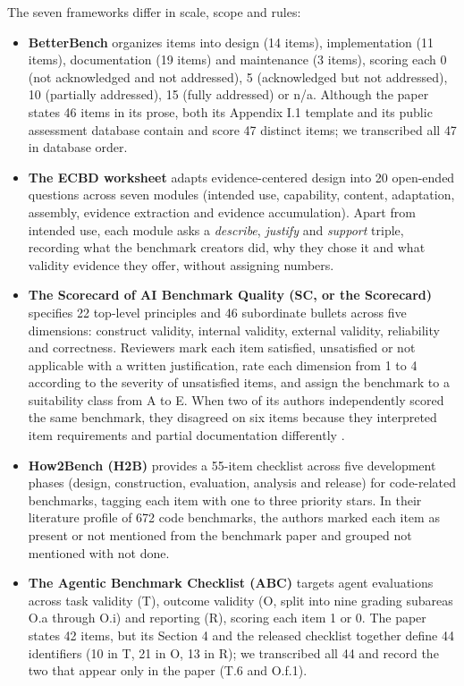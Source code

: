 \documentclass[10pt,conference]{IEEEtran}
\begin{document}
The seven frameworks differ in scale, scope and rules:
\begin{itemize}
\item \textbf{BetterBench} \cite{reuel_betterbench} organizes items into design (14 items), implementation (11 items), documentation (19 items) and maintenance (3 items), scoring each 0 (not acknowledged and not addressed), 5 (acknowledged but not addressed), 10 (partially addressed), 15 (fully addressed) or n/a. Although the paper states 46 items in its prose, both its Appendix I.1 template and its public assessment database contain and score 47 distinct items; we transcribed all 47 in database order.
\item \textbf{The ECBD worksheet} \cite{liu_ecbd_2024} adapts evidence-centered design into 20 open-ended questions across seven modules (intended use, capability, content, adaptation, assembly, evidence extraction and evidence accumulation). Apart from intended use, each module asks a \emph{describe}, \emph{justify} and \emph{support} triple, recording what the benchmark creators did, why they chose it and what validity evidence they offer, without assigning numbers.
\item \textbf{The Scorecard of AI Benchmark Quality (SC, or the Scorecard)} \cite{san_joaquin_scorecard_2026} specifies 22 top-level principles and 46 subordinate bullets across five dimensions: construct validity, internal validity, external validity, reliability and correctness. Reviewers mark each item satisfied, unsatisfied or not applicable with a written justification, rate each dimension from 1 to 4 according to the severity of unsatisfied items, and assign the benchmark to a suitability class from A to E. When two of its authors independently scored the same benchmark, they disagreed on six items because they interpreted item requirements and partial documentation differently \cite{san_joaquin_scorecard_2026}.
\item \textbf{How2Bench (H2B)} \cite{cao_how2bench_2025} provides a 55-item checklist across five development phases (design, construction, evaluation, analysis and release) for code-related benchmarks, tagging each item with one to three priority stars. In their literature profile of 672 code benchmarks, the authors marked each item as present or not mentioned from the benchmark paper and grouped not mentioned with not done.
\item \textbf{The Agentic Benchmark Checklist (ABC)} \cite{zhu_agentic_benchmark_checklist_2025} targets agent evaluations across task validity (T), outcome validity (O, split into nine grading subareas O.a through O.i) and reporting (R), scoring each item 1 or 0. The paper states 42 items, but its Section 4 and the released checklist together define 44 identifiers (10 in T, 21 in O, 13 in R); we transcribed all 44 and record the two that appear only in the paper (T.6 and O.f.1).

\end{itemize}
\end{document}
